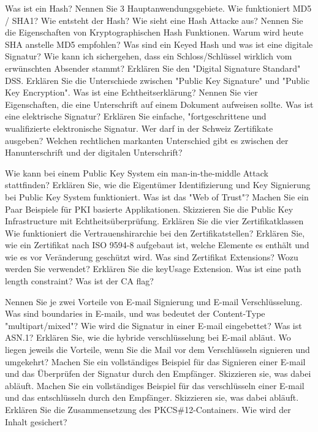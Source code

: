 \documentclass[ngerman,a4paper,12pt]{scrreprt}
\begin{document}
\olR
	\li Was ist ein Hash? Nennen Sie 3 Hauptanwendungsgebiete.
	\li Wie funktioniert MD5 / SHA1? Wie entsteht der Hash?
	\li Wie sieht eine Hash Attacke aus?
	\li Nennen Sie die Eigenschaften von Kryptographischen Hash Funktionen.
	\li Warum wird heute SHA anstelle MD5 empfohlen?
	\li Was sind ein Keyed Hash und was ist eine digitale Signatur?
	\li Wie kann ich sichergehen, dass ein Schloss/Schlüssel wirklich vom erwünschten Absender stammt?
	\li Erklären Sie den "Digital Signature Standard" DSS.
	\li Erklären Sie die Unterschiede zwischen "Public Key Signature" und "Public Key Encryption".
	\li Was ist eine Echtheitserklärung? Nennen Sie vier Eigenschaften, die eine Unterschrift auf einem Dokument aufweisen sollte.
	\li Was ist eine elektrische Signatur? Erklären Sie einfache, "fortgeschrittene und wualifizierte elektronische Signatur.
	\li Wer darf in der Schweiz Zertifikate ausgeben?
	\li Welchen rechtlichen markanten Unterschied gibt es zwischen der Hanunterschrift und der digitalen Unterschrift?
\olS

\olR
	\li Wie kann bei einem Public Key System ein man-in-the-middle Attack stattfinden?
	\li Erklären Sie, wie die Eigentümer Identifizierung und Key Signierung bei Public Key System funktioniert.
	\li Was ist das "Web of Trust"?
	\li Machen Sie ein Paar Beispiele für PKI basierte Applikationen.
	\li Skizzieren Sie die Public Key Infrastructure  mit Echtheitsüberprüfung.
	\li Erklären Sie die vier Zertifikatklassen
	\li Wie funktioniert die Vertrauenshirarchie bei den Zertifikatstellen?
	\li Erklären Sie, wie ein Zertifikat nach ISO 9594-8 aufgebaut ist, welche Elemente es enthält und wie es vor Veränderung geschützt wird.
	\li Was sind Zertifikat Extensions? Wozu werden Sie verwendet? Erklären Sie die keyUsage Extension.
	\li Was ist eine path length constraint?
	\li Was ist der CA flag?
\olS

\olR
	\li Nennen Sie je zwei Vorteile von E-mail Signierung und E-mail Verschlüsselung.
	\li Was sind boundaries in E-mails, und was bedeutet der Content-Type "multipart/mixed"?
	\li Wie wird die Signatur in einer E-mail eingebettet?
	\li Was ist ASN.1?
	\li Erklären Sie, wie die hybride verschlüsselung bei E-mail abläut.
	\li Wo liegen jeweils die Vorteile, wenn Sie die Mail vor dem Verschlüsseln signieren und umgekehrt?
	\li Machen Sie ein vollständiges Beispiel für das Signieren einer E-mail und das Überprüfen der Signatur durch den Empfänger. Skizzieren sie, was dabei abläuft.
	\li Machen Sie ein vollständiges Beispiel für das verschlüsseln einer E-mail und das entschlüsseln durch den Empfänger. Skizzieren sie, was dabei abläuft.
	\li Erklären Sie die Zusammensetzung des PKCS\#12-Containers. Wie wird der Inhalt gesichert?
\olS
\end{document}

